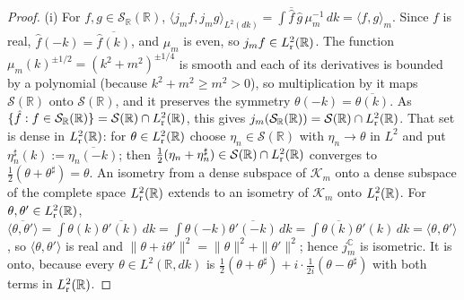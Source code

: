 \documentclass[11pt,a4paper]{article}
\theoremstyle{plain}
\theoremstyle{definition}
\theoremstyle{plain}
\theoremstyle{definition}
\newcommand{\R}{\mathbb{R}}
\newcommand{\C}{\mathbb{C}}
\newcommand{\ip}[2]{\langle #1,#2\rangle}
\begin{document}
\begin{proof}
(i) For $f,g\in\mathcal S_\R(\R)$, $\ip{j_mf}{j_mg}_{L^2(dk)}=\int\overline{\hat f}\,\hat g\,
\mu_m^{-1}\,dk=\ip fg_m$.  Since $f$ is real, $\hat f(-k)=\overline{\hat f(k)}$, and $\mu_m$ is
even, so $j_mf\in L^2_{\rm r}(\R)$.  The function $\mu_m(k)^{\pm1/2}=(k^2+m^2)^{\pm1/4}$ is
smooth and each of its derivatives is bounded by a polynomial (because $k^2+m^2\ge m^2>0$), so
multiplication by it maps $\mathcal S(\R)$ onto $\mathcal S(\R)$, and it preserves the symmetry
$\theta(-k)=\overline{\theta(k)}$.  As $\{\hat f:f\in\mathcal S_\R(\R)\}=\mathcal S(\R)\cap
L^2_{\rm r}(\R)$, this gives $j_m(\mathcal S_\R(\R))=\mathcal S(\R)\cap L^2_{\rm r}(\R)$.  That
set is dense in $L^2_{\rm r}(\R)$: for $\theta\in L^2_{\rm r}(\R)$ choose $\eta_n\in\mathcal
S(\R)$ with $\eta_n\to\theta$ in $L^2$ and put $\eta_n^\sharp(k):=\overline{\eta_n(-k)}$; then
$\frac12(\eta_n+\eta_n^\sharp)\in\mathcal S(\R)\cap L^2_{\rm r}(\R)$ converges to
$\frac12(\theta+\theta^\sharp)=\theta$.  An isometry from a dense subspace of $\mathcal K_m$
onto a dense subspace of the complete space $L^2_{\rm r}(\R)$ extends to an isometry of
$\mathcal K_m$ onto $L^2_{\rm r}(\R)$.  For $\theta,\theta'\in L^2_{\rm r}(\R)$,
$\overline{\ip\theta{\theta'}}=\int\theta(k)\overline{\theta'(k)}\,dk=\int\theta(-k)
\overline{\theta'(-k)}\,dk=\int\overline{\theta(k)}\theta'(k)\,dk=\ip\theta{\theta'}$, so
$\ip\theta{\theta'}$ is real and $\|\theta+i\theta'\|^2=\|\theta\|^2+\|\theta'\|^2$; hence
$j_m^{\C}$ is isometric.  It is onto, because every $\theta\in L^2(\R,dk)$ is
$\frac12(\theta+\theta^\sharp)+i\cdot\frac1{2i}(\theta-\theta^\sharp)$ with both terms in
$L^2_{\rm r}(\R)$.


\end{proof}
\end{document}
